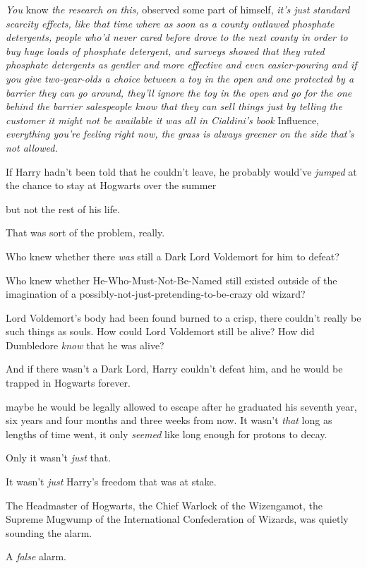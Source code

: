 \emph{You} know \emph{the research on this,} observed some part of himself,
\emph{it's just standard scarcity effects, like that time where as soon as a
county outlawed phosphate detergents, people who'd never cared before drove to
the next county in order to buy huge loads of phosphate detergent, and surveys
showed that they rated phosphate detergents as gentler and more effective and
even easier-pouring{\el} and if you give two-year-olds a choice between a
toy in the open and one protected by a barrier they can go around, they'll
ignore the toy in the open and go for the one behind the barrier{\el}
salespeople know that they can sell things just by telling the customer it
might not be available{\el} it was all in Cialdini's book} Influence, \emph{
everything you're feeling right now, the grass is always greener on the side
that's not allowed.}

If Harry hadn't been told that he couldn't leave, he probably would've
\emph{jumped} at the chance to stay at Hogwarts over the summer{\el}

{\el} but not the rest of his life.

That was sort of the problem, really.

Who knew whether there \emph{was} still a Dark Lord Voldemort for him to defeat?

Who knew whether He-Who-Must-Not-Be-Named still existed outside of the
imagination of a possibly-not-just-pretending-to-be-crazy old wizard?

Lord Voldemort's body had been found burned to a crisp, there couldn't really
be such things as souls. How could Lord Voldemort still be alive? How did
Dumbledore \emph{know} that he was alive?

And if there wasn't a Dark Lord, Harry couldn't defeat him, and he would be
trapped in Hogwarts forever.

{\el} maybe he would be legally allowed to escape after he graduated his
seventh year, six years and four months and three weeks from now. It wasn't
\emph{that} long as lengths of time went, it only \emph{seemed} like long
enough for protons to decay.

Only it wasn't \emph{just} that.

It wasn't \emph{just} Harry's freedom that was at stake.

The Headmaster of Hogwarts, the Chief Warlock of the Wizengamot, the Supreme
Mugwump of the International Confederation of Wizards, was quietly sounding the
alarm.

A \emph{false} alarm.

